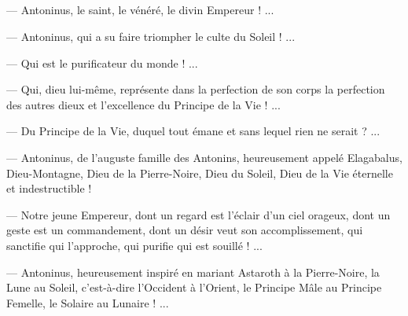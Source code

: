 \documentclass[a4paper, 11pt, oneside, polutonikogreek, french]{article}
\begin{document}
\subsection{}
\paragraph{}
--- Antoninus, le saint, le vénéré, le divin Empereur ! ...

--- Antoninus, qui a su faire triompher le culte du Soleil ! ...

--- Qui est le purificateur du monde ! ...

--- Qui, dieu lui-même, représente dans la perfection de son corps la perfection des autres dieux et l'excellence du Principe de la Vie ! ...

--- Du Principe de la Vie, duquel tout émane et sans lequel rien ne serait ? ...

--- Antoninus, de l'auguste famille des Antonins, heureusement appelé Elagabalus, Dieu-Montagne, Dieu de la Pierre-Noire, Dieu du Soleil, Dieu de la Vie éternelle et indestructible !

--- Notre jeune Empereur, dont un regard est l'éclair d'un ciel orageux, dont un geste est un commandement, dont un désir veut son accomplissement, qui sanctifie qui l'approche, qui purifie qui est souillé ! ...

--- Antoninus, heureusement inspiré en mariant Astaroth à la Pierre-Noire, la Lune au Soleil, c'est-à-dire l'Occident à l'Orient, le Principe Mâle au Principe Femelle, le Solaire au Lunaire ! ...
\end{document}
